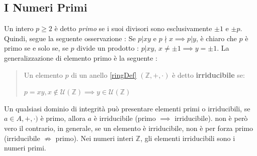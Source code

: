\documentclass[12pt, letterpaper]{article}
\begin{document}
\subsection{I Numeri Primi}
Un intero \(p\ge 2\) è detto \textit{primo} se i suoi divisori sono esclusivamente \(\pm 1\) e \(\pm p\). Quindi,
 segue la seguente osservazione : Se \(p|xy\) e \(p\nmid x \implies p|y\), è chiaro che \(p\) è primo 
 se e solo se, se \(p\) divide un prodotto : \(p|xy\), \(x\ne \pm1\implies y=\pm 1\). La generalizzazione 
 di elemento primo è la seguente :
 \begin{quote}
    Un elemento \(p\) di un anello \ref{ringDef} \((\mathbb{Z},+,\cdot)\) è detto \textbf{irriducibile} se:\begin{center} \(p=xy, x\notin \mathcal{U}(\mathbb{Z})\implies y\in \mathcal{U}(\mathbb{Z})\) 
    \end{center}\end{quote}
Un qualsiasi dominio di integrità può presentare elementi primi o irriducibili, se \(a\in A,+,\cdot)\) è primo, 
allora \(a\) è irriducibile (primo \(\implies\) irriducibile). non è però vero il contrario, in generale, se un elemento 
è irriducibile, non è per forza primo (irriducibile \(\nRightarrow \) primo). Nei numeri interi \(\mathbb{Z}\), 
gli elementi irriducibili sono i numeri primi. 
\end{document}
